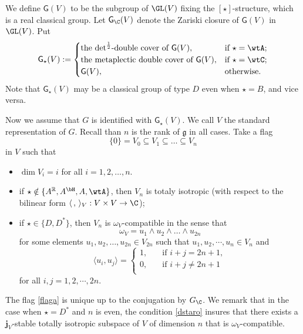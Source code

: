 \documentclass[12pt,a4paper]{amsart}
\def\subset{\subseteq}
\newcommand{\g}{\mathfrak g}
\newcommand{\R}{\mathbb R}
\newcommand{\la}{\langle}
\newcommand{\ra}{\rangle}
\newcommand{\be}{\begin {equation}}
\newcommand{\ee}{\end {equation}}
\numberwithin{equation}{section}
\theoremstyle{remark}
\begin{document}
 We define $\mathsf G(V)$ to be the subgroup of $\GL(V)$ fixing the $[\star]$-structure, which is a real classical group.  Let $\mathsf G_\C(V)$ denote the Zariski closure of $\mathsf G(V)$ in $\GL(V)$.
Put
\[
  \mathsf G_\star(V):=\begin{cases}
   \textrm{the $\det^{\frac{1}{2}}$-double cover of $\mathsf G(V)$},  &  \text{if $\star=\wtA$};\\
 \textrm{the metaplectic double cover of $\mathsf G(V)$},  &  \text{if $\star=\wtC$};\\
  \mathsf G(V),    &  \text{otherwise.}
    \end{cases}
\]
Note that  $\mathsf G_\star(V)$ may be a classical group of type $D$ even when $\star=B$, and vice versa.


Now we assume that $G$ is identified with $\mathsf G_\star(V)$.  We call $V$ the standard representation of $G$.
Recall than $n$ is the rank of $\g$ in all cases. Take a  flag
\be\label{flaga}
\{ 0\}= V_0 \subset V_1\subset \dots \subset  V_{n}
\ee
in $V$ such that
\begin{itemize}
 \item
$\dim V_i=i$ for all $i=1,2, \dots, n$.

\item
if $\star\notin \{A^\R, A^\bH, A, \wtA\}$, then $
  V_{n}
$ is totaly isotropic (with respect to the bilinear form $\la\,,\,\ra_V: V\times V\rightarrow \C$);

\item
if $\star\in \{D, D^*\}$, then $V_n$ is $\omega_V$-compatible    in the sense that
\[
  \omega_V= u_1\wedge u_2\wedge \dots \wedge u_{2n}%
\]
for some elements $u_1, u_2, \dots, u_{2n}\in V_{2n}$ such that $u_1, u_2, \cdots, u_n\in V_n$ and
\[
\la u_i, u_{j}\ra=\begin{cases}
   1, &\quad \textrm{if $i+j=2n+1$},\\
   0,&  \quad \textrm{if $i+j\neq 2n+1$}\\
  \end{cases}
\]
for all $i,j=1,2, \cdots, 2n$.

\end{itemize}
The flag \eqref{flaga} is unique up to the conjugation by $G_\C$. We remark that in the case when $\star=D^*$  and $n$ is even,  the condition \eqref{dstaro} insures that there exists a
$\mathbf j_V$-stable totally isotropic subspace of $V$ of dimension $n$ that is $\omega_V$-compatible.
\end{document}
